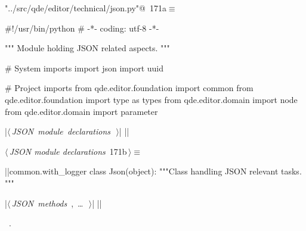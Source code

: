 \documentclass[%
    a4paper,    %
    justified,  %
    nobib,      %
    openany     %
]{tufte-book}
\begin{document}
\begin{flushleft} \small
\begin{minipage}{\linewidth}\label{scrap194}\raggedright\small
{} \verb@"../src/qde/editor/technical/json.py"@\nobreak\ {\footnotesize {171a}}$\equiv$
\vspace{-1ex}
\begin{pythoncode}
#!/usr/bin/python
# -*- coding: utf-8 -*-

""" Module holding JSON related aspects.
"""

# System imports
import json
import uuid

# Project imports
from qde.editor.foundation import common
from qde.editor.foundation import type as types
from qde.editor.domain import node
from qde.editor.domain import parameter


|\hbox{$\langle\,${\itshape JSON module declarations}\nobreak\ {\footnotesize {}}$\,\rangle$}|
|\NWsep|
\end{pythoncode}
\vspace{1.5ex}
\footnotesize
\begin{list}{}{\setlength{\itemsep}{-\parsep}\setlength{\itemindent}{-\leftmargin}}

\item{}
\end{list}
\end{minipage}\vspace{4ex}
\end{flushleft}
\begin{flushleft} \small
\begin{minipage}{\linewidth}\label{scrap195}\raggedright\small
{} $\langle\,${\itshape JSON module declarations}\nobreak\ {\footnotesize {171b}}$\,\rangle\equiv$
\vspace{-1ex}
\begin{pythoncode}
|\normalfont{}\fontfamily{}|common.with_logger
class Json(object):
    """Class handling JSON relevant tasks.
    """

    |\hbox{$\langle\,${\itshape JSON methods}\nobreak\ {\footnotesize {}, \ldots\ }$\,\rangle$}|
|\NWsep|
\end{pythoncode}
\vspace{1.5ex}
\footnotesize
\begin{list}{}{\setlength{\itemsep}{-\parsep}\setlength{\itemindent}{-\leftmargin}}
\item \NWtxtMacroRefIn\ .

\item{}
\end{list}
\end{minipage}\vspace{4ex}
\end{flushleft}
\end{document}
